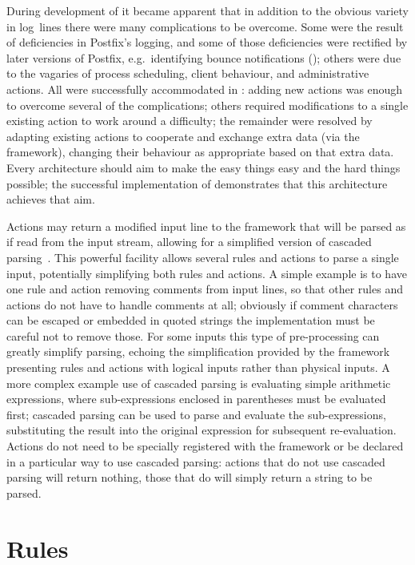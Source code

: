 During development of \parsername{} it became apparent that in addition to
the obvious variety in log~lines there were many complications to be
overcome.  Some were the result of deficiencies in Postfix's logging, and
some of those deficiencies were rectified by later versions of Postfix,
e.g.\ identifying bounce notifications
(); others were due to the
vagaries of process scheduling, client behaviour, and administrative
actions.  All were successfully accommodated in \parsername{}: adding new
actions was enough to overcome several of the complications; others
required modifications to a single existing action to work around a
difficulty; the remainder were resolved by adapting existing actions to
cooperate and exchange extra data (via the framework), changing their
behaviour as appropriate based on that extra data.  Every architecture
should aim to make the easy things easy and the hard things possible; the
successful implementation of \parsername{} demonstrates that this
architecture achieves that aim.

Actions may return a modified input line to the framework that will be
parsed as if read from the input stream, allowing for a simplified version
of cascaded parsing~\cite{cascaded-parsing}.  This powerful facility allows
several rules and actions to parse a single input, potentially simplifying
both rules and actions.  A simple example is to have one rule and action
removing comments from input lines, so that other rules and actions do not
have to handle comments at all; obviously if comment characters can be
escaped or embedded in quoted strings the implementation must be careful
not to remove those.  For some inputs this type of pre-processing can
greatly simplify parsing, echoing the simplification provided by the
framework presenting rules and actions with logical inputs rather than
physical inputs.  A more complex example use of cascaded parsing is
evaluating simple arithmetic expressions, where sub-expressions enclosed in
parentheses must be evaluated first; cascaded parsing can be used to parse
and evaluate the sub-expressions, substituting the result into the original
expression for subsequent re-evaluation.  Actions do not need to be
specially registered with the framework or be declared in a particular way
to use cascaded parsing: actions that do not use cascaded parsing will
return nothing, those that do will simply return a string to be parsed.

\section{Rules}

